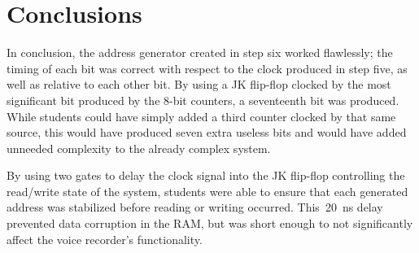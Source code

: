 \section{Conclusions}

In conclusion, the address generator created in step six worked flawlessly; the
timing of each bit was correct with respect to the clock produced in step five,
as well as relative to each other bit.  By using a JK flip-flop clocked by
the most significant bit produced by the 8-bit counters, a seventeenth bit was
produced.  While students could have simply added a third counter clocked by
that same source, this would have produced seven extra useless bits and would
have added unneeded complexity to the already complex system.

By using two  gates to delay the clock signal into the JK flip-flop
controlling the read/write state of the system, students were able to ensure
that each generated address was stabilized before reading or writing occurred.
This~\SI{20}{\nano\second} delay prevented data corruption in the RAM, but was
short enough to not significantly affect the voice recorder's functionality.
